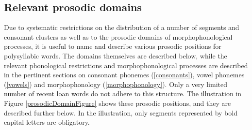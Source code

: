 \subsection{Relevant prosodic domains}\label{prosodicDomains}
Due to systematic restrictions on the distribution of a number of segments and consonant clusters as well as to the prosodic domains of morphophonological processes, it is useful to name and describe various prosodic positions for polysyllabic words. The domains themselves are described below, while the relevant phonological restrictions and morphophonological processes are described in the pertinent sections on consonant phonemes (\SEC\ref{consonants}), vowel phonemes (\SEC\ref{vowels}) and morphophonology (\SEC\ref{morphophonology}). Only a very limited number of recent loan words do not adhere to this structure. 
The illustration in Figure \vref{prosodicDomainFigure} shows these prosodic positions, and they are described further below. In the illustration, only segments represented by bold capital letters are obligatory.
\newcommand{\Cyes}{\Bf{C}}
\newcommand{\Cno}{c}
\newcommand{\Vyes}{\Bf{V}}
\newcommand{\Vno}{v}

